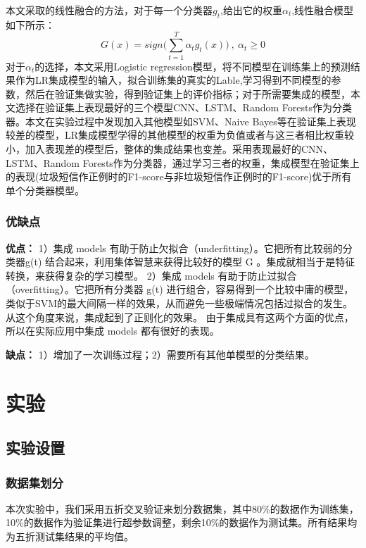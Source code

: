 \documentclass[a4paper]{article}
\begin{document}
本文采取的线性融合的方法，对于每一个分类器$g_t$,给出它的权重$\alpha_t$,线性融合模型如下所示：
\begin{equation}
G(x) = sign\bigg(\sum_{t=1}^{T}\alpha_t  g_t(x)\bigg)\ ,\ \alpha_t \ge 0
\end{equation}
对于$\alpha_t$的选择，本文采用Logistic regression模型，将不同模型在训练集上的预测结果作为LR集成模型的输入，拟合训练集的真实的Lable,学习得到不同模型的参数，然后在验证集做实验，得到验证集上的评价指标；对于所需要集成的模型，本文选择在验证集上表现最好的三个模型CNN、LSTM、Random Forests作为分类器。本文在实验过程中发现加入其他模型如SVM、Naive Bayes等在验证集上表现较差的模型，LR集成模型学得的其他模型的权重为负值或者与这三者相比权重较小，加入表现差的模型后，整体的集成结果也变差。采用表现最好的CNN、LSTM、Random Forests作为分类器，通过学习三者的权重，集成模型在验证集上的表现(垃圾短信作正例时的F1-score与非垃圾短信作正例时的F1-score)优于所有单个分类器模型。
\subsubsection{优缺点}
\textbf{优点：}
1）集成 models 有助于防止欠拟合（underfitting）。它把所有比较弱的分类器g(t) 结合起来，利用集体智慧来获得比较好的模型 G 。集成就相当于是特征转换，来获得复杂的学习模型。
2）集成 models 有助于防止过拟合（overfitting）。它把所有分类器 g(t) 进行组合，容易得到一个比较中庸的模型，类似于SVM的最大间隔一样的效果，从而避免一些极端情况包括过拟合的发生。从这个角度来说，集成起到了正则化的效果。
由于集成具有这两个方面的优点，所以在实际应用中集成 models 都有很好的表现。

\textbf{缺点：}
1）增加了一次训练过程；2）需要所有其他单模型的分类结果。



\section{实验} 

\subsection{实验设置}

\subsubsection{数据集划分}
本次实验中，我们采用五折交叉验证来划分数据集，其中80\%的数据作为训练集，10\%的数据作为验证集进行超参数调整，剩余10\%的数据作为测试集。所有结果均为五折测试集结果的平均值。
\end{document}

